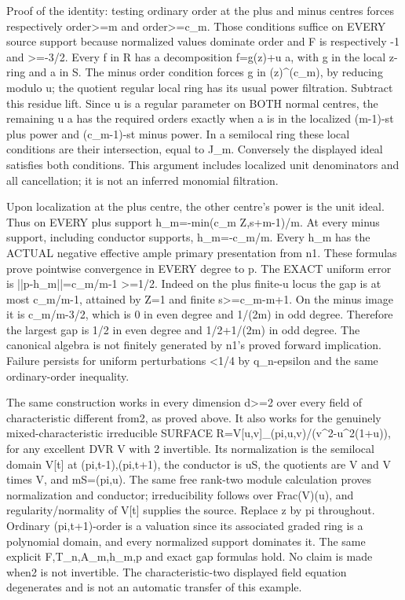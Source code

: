 \documentclass[11pt]{article}
\begin{document}
Proof of the identity: testing ordinary order at the plus and minus centres forces respectively order\textgreater{}=m and order\textgreater{}=c\_m. Those conditions suffice on EVERY source support because normalized values dominate order and F is respectively -1 and \textgreater{}=-3/2. Every f in R has a decomposition f=g(z)+u a, with g in the local z-ring and a in S. The minus order condition forces g in (z)\textasciicircum{}(c\_m), by reducing modulo u; the quotient regular local ring has its usual power filtration. Subtract this residue lift. Since u is a regular parameter on BOTH normal centres, the remaining u a has the required orders exactly when a is in the localized (m-1)-st plus power and (c\_m-1)-st minus power. In a semilocal ring these local conditions are their intersection, equal to J\_m. Conversely the displayed ideal satisfies both conditions. This argument includes localized unit denominators and all cancellation; it is not an inferred monomial filtration.

Upon localization at the plus centre, the other centre's power is the unit ideal. Thus on EVERY plus support
h\_m=-min(c\_m Z,s+m-1)/m.
At every minus support, including conductor supports, h\_m=-c\_m/m. Every h\_m has the ACTUAL negative effective ample primary presentation from n1. These formulas prove pointwise convergence in EVERY degree to p. The EXACT uniform error is
||p-h\_m||=c\_m/m-1 \textgreater{}=1/2.
Indeed on the plus finite-u locus the gap is at most c\_m/m-1, attained by Z=1 and finite s\textgreater{}=c\_m-m+1. On the minus image it is c\_m/m-3/2, which is 0 in even degree and 1/(2m) in odd degree. Therefore the largest gap is 1/2 in even degree and 1/2+1/(2m) in odd degree. The canonical algebra is not finitely generated by n1's proved forward implication. Failure persists for uniform perturbations \textless{}1/4 by q\_n-epsilon and the same ordinary-order inequality.

The same construction works in every dimension d\textgreater{}=2 over every field of characteristic different from2, as proved above. It also works for the genuinely mixed-characteristic irreducible SURFACE R=V[u,v]\_(pi,u,v)/(v\textasciicircum{}2-u\textasciicircum{}2(1+u)), for any excellent DVR V with 2 invertible. Its normalization is the semilocal domain V[t] at (pi,t-1),(pi,t+1), the conductor is uS, the quotients are V and V times V, and mS=(pi,u). The same free rank-two module calculation proves normalization and conductor; irreducibility follows over Frac(V)(u), and regularity/normality of V[t] supplies the source. Replace z by pi throughout. Ordinary (pi,t+1)-order is a valuation since its associated graded ring is a polynomial domain, and every normalized support dominates it. The same explicit F,T\_n,A\_m,h\_m,p and exact gap formulas hold. No claim is made when2 is not invertible. The characteristic-two displayed field equation degenerates and is not an automatic transfer of this example.
\end{document}
